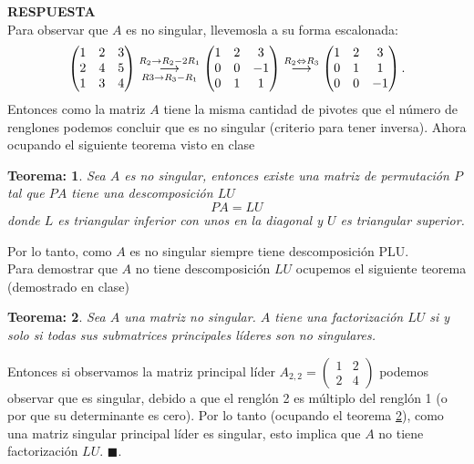 \documentclass[11pt,letterpaper]{article}
\newcommand{\res}{\textbf{RESPUESTA}\\}
\newcommand{\fin}{$\blacksquare.$}
\newcommand{\grstep}[2][\relax]{%
   \ensuremath{\mathrel{
       {\mathop{\longrightarrow}\limits^{#2\mathstrut}_{
                                     \begin{subarray}{l} #1 \end{subarray}}}}}}
\newtheorem{thmt}{Teorema:}
\begin{document}
\begin{enumerate}
\res 
Para observar que $A$ es no singular, llevemosla a su forma escalonada:
\begin{align*}
\begin{pmatrix}
1 & 2 & 3\\
2 & 4 & 5\\
1 & 3 & 4
\end{pmatrix}%
\grstep[R3 \rightarrow R_3-R_1]{R_2 \rightarrow R_2-2R_1}
%
\begin{pmatrix}
1 & 2 & 3\\
0 & 0 & -1\\
0 & 1 & 1
\end{pmatrix}%
\grstep[]{R_2 \Leftrightarrow R_3}
%
\begin{pmatrix}
1 & 2 & 3\\
0 & 1 & 1\\
0 & 0 & -1
\end{pmatrix}.
\end{align*}
Entonces como la matriz $A$ tiene la misma cantidad de pivotes que el número de renglones podemos concluir que es no singular (criterio para tener inversa). Ahora ocupando el siguiente teorema visto en clase
\begin{framed}
    \begin{thmt} \label{inversa_PA=LU}
    Sea $A$ es no singular, entonces existe una matriz de permutación $P$ tal que $PA$ tiene una descomposición $LU$
    $$PA=LU$$
    donde $L$ es triangular inferior con unos en la diagonal y $U$ es triangular superior. 
    \end{thmt}
\end{framed} 
Por lo tanto, como $A$ es no singular siempre tiene descomposición PLU.\\

Para demostrar que $A$ no tiene descomposición $LU$ ocupemos el siguiente teorema (demostrado en clase)
\begin{framed}
    \begin{thmt} \label{submatrices_LU}
    Sea $A$ una matriz no singular. $A$ tiene una factorización $LU$ si y solo si todas sus submatrices principales líderes son no singulares. 
    \end{thmt}
\end{framed} 
Entonces si observamos la matriz principal líder $
A_{2,2}=\begin{pmatrix}
1 & 2 \\
2 & 4
\end{pmatrix}$ podemos observar que es singular, debido a que el renglón 2 es múltiplo del renglón 1 (o por que su determinante es cero). Por lo tanto (ocupando el teorema \ref{submatrices_LU}), como una matriz singular principal líder es singular, esto implica que $A$ no tiene factorización $LU$. \fin \\


\end{enumerate}
\end{document}
